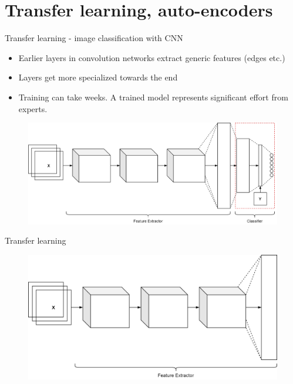 \section{Transfer learning, auto-encoders}

\begin{frame}{Transfer learning - image classification with CNN}
\begin{itemize}
	\item Earlier layers in convolution networks extract generic features (edges etc.)
	\item Layers get more specialized towards the end
	\item Training can take weeks. A trained model represents significant effort
	from experts. 
\end{itemize}
	\begin{center}
		\begin{figure}
			\includegraphics[width=.7\textwidth]{figures/deep_cnn_transfer_learning_1}
		\end{figure}
	\end{center}
\end{frame}
\begin{frame}{Transfer learning}
	\begin{center}
		\begin{figure}
			\includegraphics[width=1\textwidth]{figures/deep_cnn_transfer_learning_2}
		\end{figure}
	\end{center}
\end{frame}
